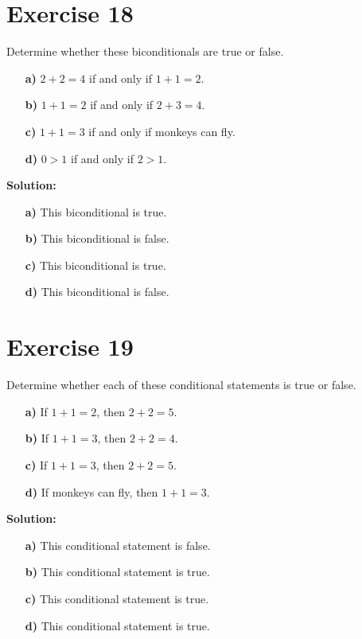 \documentclass{Axon}
\begin{document}
\section*{Exercise 18}
Determine whether these biconditionals are true or false.
\begin{enumerate}
    \item[\textbf{a)}] \(2 + 2 = 4\) if and only if \(1 + 1 = 2\).
    \item[\textbf{b)}] \(1 + 1 = 2\) if and only if \(2 + 3 = 4\).
    \item[\textbf{c)}] \(1 + 1 = 3\) if and only if monkeys can fly.
    \item[\textbf{d)}] \(0 > 1\) if and only if \(2 > 1\).
\end{enumerate}

\noindent
\textbf{Solution:}
\begin{enumerate}
    \item[\textbf{a)}] This biconditional is true.
    \item[\textbf{b)}] This biconditional is false.
    \item[\textbf{c)}] This biconditional is true.
    \item[\textbf{d)}] This biconditional is false.
\end{enumerate}

\section*{Exercise 19}
Determine whether each of these conditional statements is true or false.
\begin{enumerate}
    \item[\textbf{a)}] If \(1 + 1 = 2\), then \(2 + 2 = 5\).
    \item[\textbf{b)}] If \(1 + 1 = 3\), then \(2 + 2 = 4\).
    \item[\textbf{c)}] If \(1 + 1 = 3\), then \(2 + 2 = 5\).
    \item[\textbf{d)}] If monkeys can fly, then \(1 + 1 = 3\).
\end{enumerate}

\noindent
\textbf{Solution:}
\begin{enumerate}
    \item[\textbf{a)}] This conditional statement is false.
    \item[\textbf{b)}] This conditional statement is true.
    \item[\textbf{c)}] This conditional statement is true.
    \item[\textbf{d)}] This conditional statement is true.
\end{enumerate}
\end{document}
